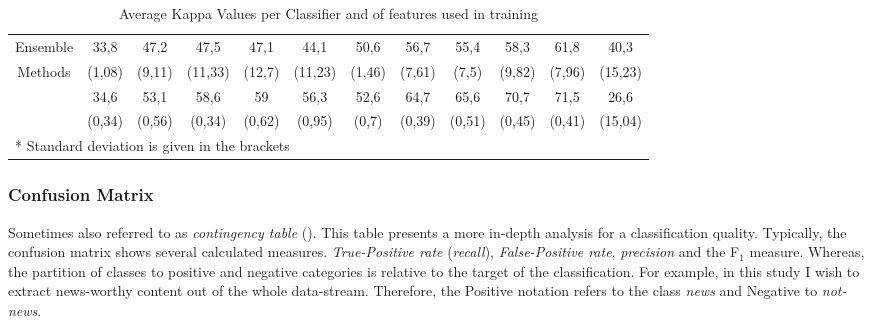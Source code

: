 \begin{table}[H]
{\begin{tabular}{c|ccccc | ccccc | c}
				\vspace*{-2mm}
				Ensemble & 33,8 & 47,2 & 47,5 & 47,1 & 44,1 & 50,6 & 56,7 & 55,4 & 58,3 & 61,8 & 40,3 \\
				Methods & (1,08) & (9,11) & (11,33) & (12,7) & (11,23) & (1,46) & (7,61) & (7,5) & (9,82) & (7,96) & (15,23) \\
				\vspace*{-2mm}
				\multirow{2}{*}{Vote} & 34,6 & 53,1 & 58,6 & 59 & 56,3 & 52,6 & 64,7 & 65,6 & 70,7 & 71,5 & 26,6 \\
					& (0,34) & (0,56) & (0,34) & (0,62) & (0,95) & (0,7) & (0,39) & (0,51) & (0,45) & (0,41) & (15,04) \\
				\hline\hline	
				\multicolumn{11}{l}{* Standard deviation is given in the brackets}\\			
			\end{tabular}
			}
			\captionsetup{width=0.8\textwidth}
			\caption[Average Kappa Values]{Average Kappa Values per Classifier and \textnumero of features used in training}
			\label{tab:kappa}%
		\end{table}%
		
		\subsubsection{Confusion Matrix}		
		Sometimes also referred to as \textit{contingency table} (\cite{fawcett2006roc}). This table presents a more in-depth analysis for a classification quality. Typically, the confusion matrix shows several calculated measures. \textit{True-Positive rate} (\textit{recall}), \textit{False-Positive rate}, \textit{precision} and the F$ _1 $ measure. Whereas, the partition of classes to positive and negative categories is relative to the target of the classification. For example, in this study I wish to extract news-worthy content out of the whole data-stream. Therefore, the Positive notation refers to the class \textit{news} and Negative to \textit{not-news}. 
		

